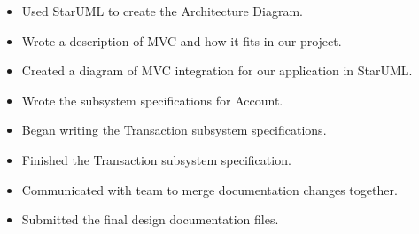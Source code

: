 \documentclass{article}
\begin{document}
  \begin{itemize}
    \item Used StarUML to create the Architecture Diagram.
  \end{itemize}

  \begin{itemize}
    \item Wrote a description of MVC and how it fits in our project.
  \end{itemize}
  \begin{itemize}
    \item Created a diagram of MVC integration for our application in StarUML.
  \end{itemize}
  \begin{itemize}
    \item Wrote the subsystem specifications for Account.
    \item Began writing the Transaction subsystem specifications.
  \end{itemize}
  \begin{itemize}
    \item Finished the Transaction subsystem specification.
    \item Communicated with team to merge documentation changes together.
    \item Submitted the final design documentation files.
  \end{itemize}
\end{document}
